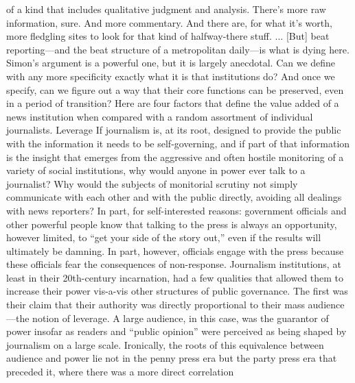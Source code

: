 of a kind that includes qualitative judgment and analysis. There’s more
raw information, sure. And more commentary. And there are, for what
it’s worth, more fledgling sites to look for that kind of halfway-there
stuff. ... [But] beat reporting—and the beat structure of a metropolitan
daily—is what is dying here.
Simon’s argument is a powerful one, but it is largely anecdotal. Can we define
with any more specificity exactly what it is that institutions do? And once we
specify, can we figure out a way that their core functions can be preserved, even in
a period of transition? Here are four factors that define the value added of a news
institution when compared with a random assortment of individual journalists.
Leverage
If journalism is, at its root, designed to provide the public with the information
it needs to be self-governing, and if part of that information is the insight that
emerges from the aggressive and often hostile monitoring of a variety of social
institutions, why would anyone in power ever talk to a journalist? Why would
the subjects of monitorial scrutiny not simply communicate with each other
and with the public directly, avoiding all dealings with news reporters? In part,
for self-interested reasons: government officials and other powerful people know
that talking to the press is always an opportunity, however limited, to ``get your
side of the story out,'' even if the results will ultimately be damning. In part, however,
officials engage with the press because these officials fear the consequences
of non-response.
Journalism institutions, at least in their 20th-century incarnation, had a few
qualities that allowed them to increase their power vis-a-vis other structures
of public governance. The first was their claim that their authority was directly
proportional to their mass audience—the notion of leverage. A large audience, in
this case, was the guarantor of power insofar as readers and ``public opinion'' were
perceived as being shaped by journalism on a large scale. Ironically, the roots of
this equivalence between audience and power lie not in the penny press era but
the party press era that preceded it, where there was a more direct correlation

